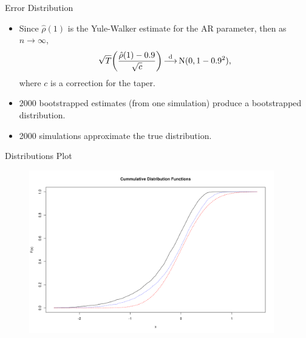 
\begin{frame}{Error Distribution}
\begin{itemize}
    \item
    Since $\hat{\rho}(1)$ is the Yule-Walker estimate for the AR parameter,
    then as $n \to \infty$,
        \[
        \sqrt{T} \biggl( \frac{\hat{\rho}(1) - 0.9}{\sqrt{c}} \biggr)
        \mathop{\overset{\mathrm{d}}{\longrightarrow}}
        \operatorname{N}(0, 1 - 0.9^2),
        \]
    where $c$ is a correction for the taper.

    \item
    $2000$ bootstrapped estimates (from one simulation)
    produce a bootstrapped distribution.

    \item
    2000 simulations approximate the true distribution.
\end{itemize}
\end{frame}

\begin{frame}{Distributions Plot}
    \begin{figure}
    \centering
    \includegraphics[width = 0.95\textwidth]{res/ex1_cdf.png}
    \end{figure}
\end{frame}

